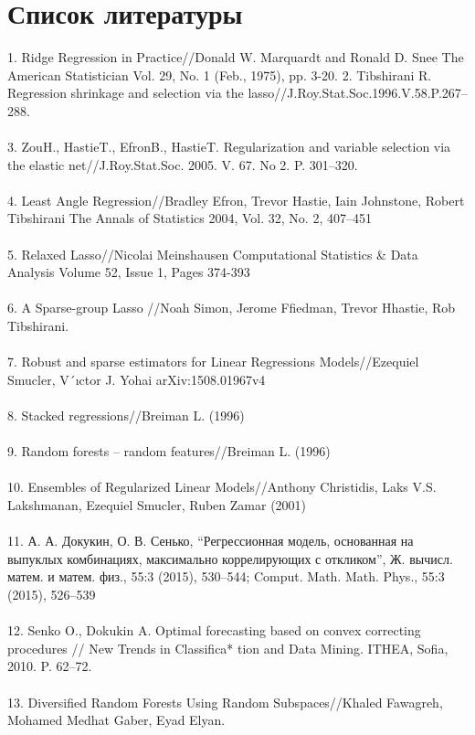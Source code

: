 \documentclass{article}
\begin{document}
\section{Список литературы}
1. Ridge Regression in Practice//Donald W. Marquardt and Ronald D. Snee The American Statistician Vol. 29, No. 1 (Feb., 1975), pp. 3-20.
2. Tibshirani R. Regression shrinkage and selection via the lasso//J.Roy.Stat.Soc.1996.V.58.P.267–288. \\ \\
3. ZouH., HastieT., EfronB., HastieT. Regularization and variable selection via the elastic net//J.Roy.Stat.Soc. 2005. V. 67. No 2. P. 301–320. \\ \\
4. Least Angle Regression//Bradley Efron, Trevor Hastie, Iain Johnstone, Robert Tibshirani The Annals of Statistics 2004, Vol. 32, No. 2, 407–451 \\ \\
5. Relaxed Lasso//Nicolai Meinshausen Computational Statistics & Data Analysis
Volume 52, Issue 1, Pages 374-393 \\ \\
6. A Sparse-group Lasso //Noah Simon, Jerome Ffiedman, Trevor Hhastie, Rob Tibshirani. \\ \\
7. Robust and sparse estimators for Linear Regressions Models//Ezequiel Smucler, V´ıctor J. Yohai arXiv:1508.01967v4 \\ \\
8. Stacked regressions//Breiman L. (1996) \\ \\
9. Random forests – random features//Breiman L. (1996) \\ \\
10. Ensembles of Regularized Linear Models//Anthony Christidis, Laks V.S. Lakshmanan, Ezequiel Smucler, Ruben Zamar (2001)\\ \\
11. А. А. Докукин, О. В. Сенько, “Регрессионная модель, основанная на выпуклых комбинациях, максимально коррелирующих с откликом”, Ж. вычисл. матем. и матем. физ., 55:3 (2015), 530–544; Comput. Math. Math. Phys., 55:3 (2015), 526–539 \\ \\
12. Senko O., Dokukin A. Optimal forecasting based on convex correcting procedures // New Trends in Classifica* tion and Data Mining. ITHEA, Sofia, 2010. P. 62–72. \\ \\
13. Diversified Random Forests Using Random Subspaces//Khaled Fawagreh, Mohamed Medhat Gaber, Eyad Elyan. \\ \\
\end{document}
